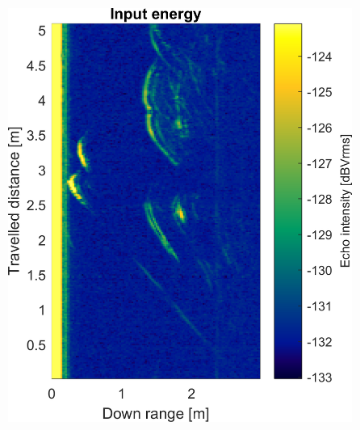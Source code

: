 \begin{figure}[htbp]
    \centering
    \begin{subfigure}[t]{0.475\linewidth}
        \centering
        \includegraphics[width=\linewidth,max height=.475\textheight]{gfx/results/washroom_input.png}
    \end{subfigure}%
    \hfill%
    \begin{subfigure}[t]{0.475\linewidth}
        \centering

\end{subfigure}
\end{figure}
